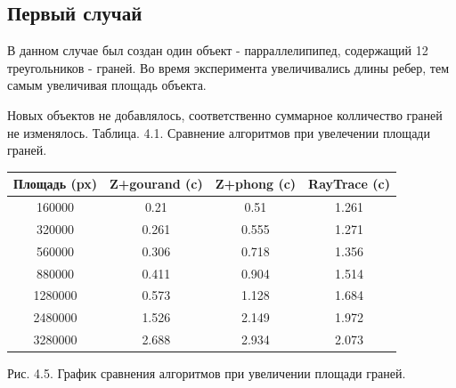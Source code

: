 \documentclass[12pt]{report}
\begin{document}
	\subsection{Первый случай}
	
	В данном случае был создан один объект - парраллелипипед, содержащий 12 треугольников - граней.
	Во время эксперимента увеличивались длины ребер, тем самым увеличивая площадь объекта.
	
	Новых объектов не добавлялось, соответственно суммарное колличество граней не изменялось.
	\newpage
	Таблица. 4.1. Сравнение алгоритмов при увелечении площади граней.
	
	\begin{center}
		\begin{tabular}{|c c c c|}
			\hline
			Площадь (px) & Z+gourand (c) & Z+phong (c) & RayTrace (c) \\ [0.5ex]
			\hline
			160000 & 0.21 & 0.51 & 1.261 \\ 
			\hline 
			320000 & 0.261 & 0.555 & 1.271 \\ 
			\hline 
			560000 & 0.306 & 0.718 & 1.356 \\ 
			\hline 
			880000 & 0.411 & 0.904 & 1.514 \\ 
			\hline 
			1280000 & 0.573 & 1.128 & 1.684 \\ 
			\hline 
			2480000 & 1.526 & 2.149 & 1.972 \\ 
			\hline 
			3280000 & 2.688 & 2.934 & 2.073 \\
			\hline
		\end{tabular}
	\end{center}

	\begin{center}
		\begin{center}
		\end{center}
		Рис. 4.5. График сравнения алгоритмов при увеличении площади граней.
	\end{center}
\end{document}

